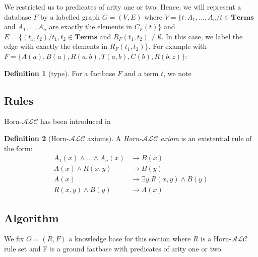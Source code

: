 \documentclass{article}
\theoremstyle{definition}
\newtheorem{definition}{Definition}[section]
\theoremstyle{remark}
\newcommand{\Terms}{\textbf{Terms}}
\begin{document}
We restricted us to predicates of arity one or two. Hence, we will represent a database $F$ by a labelled graph $G = (V,E)$ where $V = \{t:A_1,\ldots,A_n /t \in \Terms$ and $A_1,\ldots,A_n$ are exactly the elements in $C_F(t)\}$ and $E = \{(t_1,t_2) /t_1,t_2 \in \Terms$ and $R_F(t_1,t_2) \neq \emptyset$. In this case, we label the edge with exactly the elements in $R_F(t_1,t_2)\}$. For example with $F = \{A(a), B(a),R(a,b),T(a,b),C(b),R(b,z)\}$: \\



\begin{definition}[type]
For a factbase $F$ and a term $t$, we note 
\end{definition}

\subsection{Rules}

Horn-$\mathcal{ALC}$ has been introduced in \cite{Horn-ALC}

\begin{definition}[Horn-$\mathcal{ALC}$ axioms]
A \emph{Horn-$\mathcal{ALC}$ axiom} is an existential rule of the form:
\begin{align}
A_1(x) \wedge\ldots\wedge A_n(x) &\rightarrow B(x) \\
A(x) \wedge R(x,y) &\rightarrow B(y) \\
A(x) &\rightarrow \exists y.R(x,y) \wedge B(y) \\
R(x,y) \wedge B(y) &\rightarrow A(x)
\end{align}

\end{definition}




\subsection{Algorithm}
We fix $O=(R,F)$ a knowledge base for this section where $R$ is a Horn-$\mathcal{ALC}$ rule set and F is a ground factbase with predicates of arity one or two.
\end{document}
